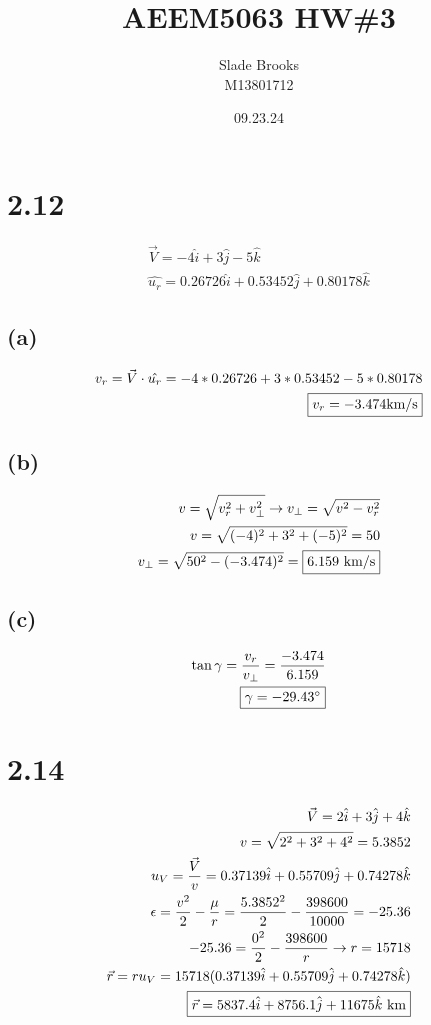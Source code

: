 \documentclass[12 pt]{article}
\title{AEEM5063 HW\#3}
\date{09.23.24}
\author{Slade Brooks \\ M13801712}
\begin{document}
\maketitle

\section*{2.12}
\begin{align*}
    \vec{V}=-4\hat{i}+3\hat{j}-5\hat{k} \\
    \hat{u_r}=0.26726\hat{i}+0.53452\hat{j}+0.80178\hat{k}
\end{align*}
\subsection*{(a)}
\begin{align*}
    v_r=\vec{V} \cdot \hat{u_r} = -4*0.26726 +3*0.53452-5*0.80178 \\
    \fbox{$v_r=-3.474 \textrm{km/s}$}
\end{align*}

\subsection*{(b)}
\begin{align*}
    v = \sqrt{v_r^2+v_{\perp}^2} \rightarrow v_{\perp}=\sqrt{v^2-v_r^2} \\
    v = \sqrt{(-4)^2+3^2+(-5)^2}=50 \\
    v_{\perp}=\sqrt{50^2-(-3.474)^2} = \fbox{$6.159$ km/s}
\end{align*}

\subsection*{(c)}
\begin{align*}
    \tan{\gamma}=\frac{v_r}{v_{\perp}}=\frac{-3.474}{6.159} \\
    \fbox{$\gamma=-29.43^{\circ}$}
\end{align*}

\section*{2.14}
\begin{align*}
    \vec{V}=2\hat{i}+3\hat{j}+4\hat{k} \\
    v=\sqrt{2^2+3^2+4^2}=5.3852 \\
    u_V=\frac{\vec{V}}{v}=0.37139\hat{i}+0.55709\hat{j}+0.74278\hat{k} \\
    \epsilon = \frac{v^2}{2}-\frac{\mu}{r}=\frac{5.3852^2}{2}-\frac{398600}{10000}=-25.36 \\
    -25.36=\frac{0^2}{2}-\frac{398600}{r} \rightarrow r=15718 \\
    \vec{r}=ru_V=15718(0.37139\hat{i}+0.55709\hat{j}+0.74278\hat{k}) \\
    \fbox{$\vec{r}=5837.4\hat{i}+8756.1\hat{j}+11675\hat{k}$ km}
\end{align*}
\end{document}

